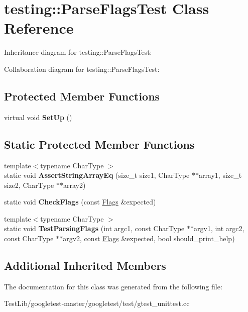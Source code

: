 \hypertarget{classtesting_1_1ParseFlagsTest}{}\section{testing\+:\+:Parse\+Flags\+Test Class Reference}
\label{classtesting_1_1ParseFlagsTest}


Inheritance diagram for testing\+:\+:Parse\+Flags\+Test\+:


Collaboration diagram for testing\+:\+:Parse\+Flags\+Test\+:
\subsection*{Protected Member Functions}
\begin{DoxyCompactItemize}
\item 
\mbox{\label{classtesting_1_1ParseFlagsTest_a72fd683f0bc0c2701d9a183c6b20cb48}} 
virtual void {\bfseries Set\+Up} ()
\end{DoxyCompactItemize}
\subsection*{Static Protected Member Functions}
\begin{DoxyCompactItemize}
\item 
\mbox{\label{classtesting_1_1ParseFlagsTest_a5d93780e65e1aa304334a8d4372c51fc}} 
{\footnotesize template$<$typename Char\+Type $>$ }\\static void {\bfseries Assert\+String\+Array\+Eq} (size\+\_\+t size1, Char\+Type $\ast$$\ast$array1, size\+\_\+t size2, Char\+Type $\ast$$\ast$array2)
\item 
\mbox{\label{classtesting_1_1ParseFlagsTest_a5919553c35ebe3910fcff51cc0b59fd6}} 
static void {\bfseries Check\+Flags} (const \hyperlink{structtesting_1_1Flags}{Flags} \&expected)
\item 
\mbox{\label{classtesting_1_1ParseFlagsTest_ad769e5f5a71939c3a9ad853b415fa9d2}} 
{\footnotesize template$<$typename Char\+Type $>$ }\\static void {\bfseries Test\+Parsing\+Flags} (int argc1, const Char\+Type $\ast$$\ast$argv1, int argc2, const Char\+Type $\ast$$\ast$argv2, const \hyperlink{structtesting_1_1Flags}{Flags} \&expected, bool should\+\_\+print\+\_\+help)
\end{DoxyCompactItemize}
\subsection*{Additional Inherited Members}


The documentation for this class was generated from the following file\+:\begin{DoxyCompactItemize}
\item 
Test\+Lib/googletest-\/master/googletest/test/gtest\+\_\+unittest.\+cc\end{DoxyCompactItemize}

